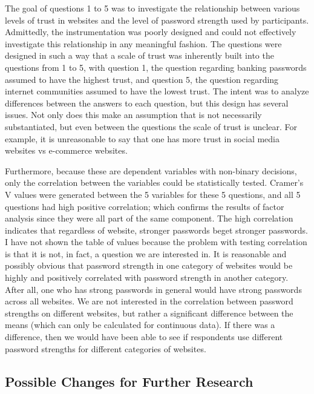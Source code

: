 \documentclass[letterpaper, 10 pt, conference]{ieeeconf}  %
\begin{document}
The goal of questions 1 to 5 was to investigate the relationship between various levels of trust in websites and the level of password strength used by participants. Admittedly, the instrumentation was poorly designed and could not effectively investigate this relationship in any meaningful fashion. The questions were designed in such a way that a scale of trust was inherently built into the questions from 1 to 5, with question 1, the question regarding banking passwords assumed to have the highest trust, and question 5, the question regarding internet communities assumed to have the lowest trust. The intent was to analyze differences between the answers to each question, but this design has several issues. Not only does this make an assumption that is not necessarily substantiated, but even between the questions the scale of trust is unclear. For example, it is unreasonable to say that one has more trust in social media websites vs e-commerce websites. 

Furthermore, because these are dependent variables with non-binary decisions, only the correlation between the variables could be statistically tested. Cramer’s V values were generated between the 5 variables for these 5 questions, and all 5 questions had high positive correlation; which confirms the results of factor analysis since they were all part of the same component. The high correlation indicates that regardless of website, stronger passwords beget stronger passwords. I have not shown the table of values because the problem with testing correlation is that it is not, in fact, a question we are interested in. It is reasonable and possibly obvious that password strength in one category of websites would be highly and positively correlated with password strength in another category. After all, one who has strong passwords in general would have strong passwords across all websites. We are not interested in the correlation between password strengths on different websites, but rather a significant difference between the means (which can only be calculated for continuous data). If there was a difference, then we would have been able to see if respondents use different password strengths for different categories of websites.

\subsection{Possible Changes for Further Research}
\end{document}
